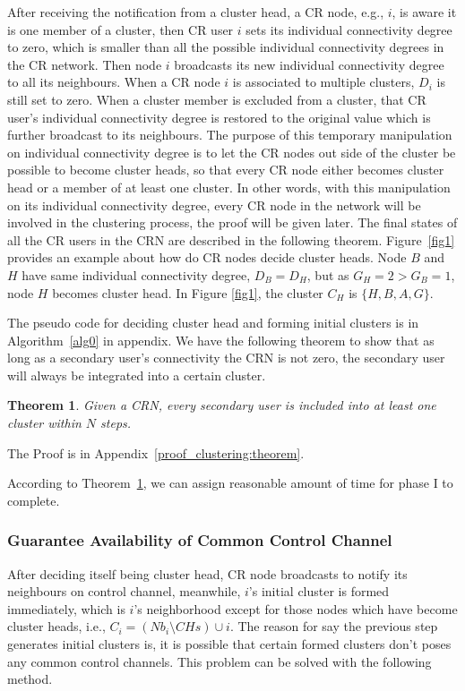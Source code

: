 \documentclass[journal,comsoc]{IEEEtran}
\theoremstyle{mytheoremstyle}
\newtheorem{theorem}{Theorem}[section]
\theoremstyle{mytheoremstyle}
\theoremstyle{mytheoremstyle}
\newcommand{\eg}{e.g., }
\newcommand{\ie}{i.e., }
\begin{document}
After receiving the notification from a cluster head, a CR node, \eg $i$, is aware it is one member of a cluster, then CR user $i$ sets its individual connectivity degree to zero, which is smaller than all the possible individual connectivity degrees in the CR network.
Then node $i$ broadcasts its new individual connectivity degree to all its neighbours. 
When a CR node $i$ is associated to multiple clusters, $D_i$ is still set to zero. %
When a cluster member is excluded from a cluster, that CR user's individual connectivity degree is restored to the original value which is further broadcast to its neighbours.
The purpose of this temporary manipulation on individual connectivity degree is to let the CR nodes out side of the cluster be possible to become cluster heads, so that every CR node either becomes cluster head or a member of at least one cluster.
In other words, with this manipulation on its individual connectivity degree, every CR node in the network will be involved in the clustering process, the proof will be given later.
The final states of all the CR users in the CRN are described in the following theorem.
Figure~\ref{fig1} provides an example about how do CR nodes decide cluster heads.
Node $B$ and $H$ have same individual connectivity degree, $D_B=D_H$, but as $G_H=2>G_B=1$, node $H$ becomes cluster head.
In Figure \ref{fig1}, the cluster $C_H$ is $\{H, B, A, G\}$.

The pseudo code for deciding cluster head and forming initial clusters is in Algorithm~\ref{alg0} in appendix.
We have the following theorem to show that as long as a secondary user's connectivity the CRN is not zero, the secondary user will always be integrated into a certain cluster.


\begin{theorem}
\label{clustering:theorem}
Given a CRN, every secondary user is included into at least one cluster within $N$ steps.
\end{theorem}
The Proof is in Appendix~\ref{proof_clustering:theorem}.

According to Theorem~\ref{clustering:theorem}, we can assign reasonable amount of time for phase I to complete.



\subsubsection{Guarantee Availability of Common Control Channel}
After deciding itself being cluster head, CR node broadcasts to notify its neighbours on control channel, meanwhile, $i$'s initial cluster is formed immediately, which is $i$'s neighborhood except for those nodes which have become cluster heads, \ie $C_i=(Nb_i\setminus CHs)\cup i$.
The reason for say the previous step generates initial clusters is, it is possible that certain formed clusters don't poses any common control channels.
This problem can be solved with the following method. 
\end{document}
